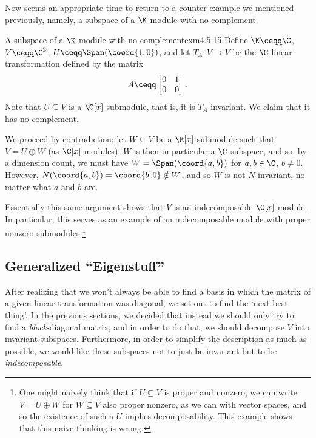 Now seems an appropriate time to return to a counter-example we mentioned previously, namely, a subspace of a $\K$-module with no complement.
\begin{exm}{A subspace of a $\K$-module with no complement}{exm4.5.15}
	Define $\K \ceqq \C$, $V\ceqq \C ^2$, $U\ceqq \Span (\coord{1,0})$, and let $T_A\colon V\rightarrow V$ be the $\C$-linear-transformation defined by the matrix
	\begin{equation}
		A\ceqq \begin{bmatrix}0 & 1 \\ 0 & 0\end{bmatrix}.
	\end{equation}
	Note that $U\subseteq V$ is a $\C [x]$-submodule, that is, it is $T_A$-invariant.  We claim that it has no complement.
	
	We proceed by contradiction:  let $W\subseteq V$ be a $\K [x]$-submodule such that $V=U\oplus W$ (as $\C [x]$-modules).  $W$ is then in particular a $\C$-subspace, and so, by a dimension count, we must have $W=\Span (\coord{a,b})$ for $a,b\in \C$, $b\neq 0$.  However, $N(\coord{a,b})=\coord{b,0}\notin W$, and so $W$ is not $N$-invariant, no matter what $a$ and $b$ are.
	\begin{rmk}
		Essentially this same argument shows that $V$ is an indecomposable $\C [x]$-module.  In particular, this serves as an example of an indecomposable module with proper nonzero submodules.\footnote{One might naively think that if $U\subseteq V$ is proper and nonzero, we can write $V=U\oplus W$ for $W\subseteq V$ also proper nonzero, as we can with vector spaces, and so the existence of such a $U$ implies decomposability.  This example shows that this naive thinking is wrong.}
	\end{rmk}
\end{exm}

\subsection{Generalized ``Eigenstuff''}

After realizing that we won't always be able to find a basis in which the matrix of a given linear-transformation was diagonal, we set out to find the `next best thing'.  In the previous sections, we decided that instead we should only try to find a \emph{block}-diagonal matrix, and in order to do that, we should decompose $V$ into invariant subspaces.  Furthermore, in order to simplify the description as much as possible, we would like these subspaces not to just be invariant but to be \emph{indecomposable}.

